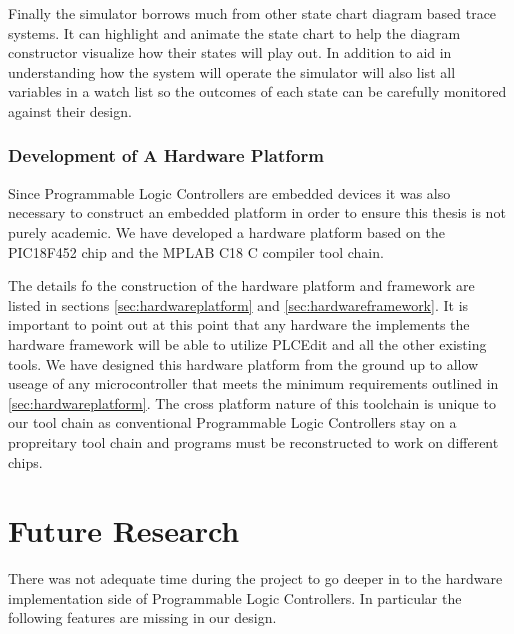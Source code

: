 Finally the simulator borrows much from other state chart diagram based trace systems. It can highlight and animate the state chart to help the diagram constructor visualize how their states will play out. In addition to aid in understanding how the system will operate the simulator will also list all variables in a watch list so the outcomes of each state can be carefully monitored against their design.

\subsubsection{Development of A Hardware Platform}
Since Programmable Logic Controllers are embedded devices it was also necessary to construct an embedded platform in order to ensure this thesis is not purely academic. We have developed a hardware platform based on the PIC18F452 chip and the MPLAB C18 C compiler tool chain.

The details fo the construction of the hardware platform and framework are listed in sections \ref{sec:hardwareplatform} and \ref{sec:hardwareframework}. It is important to point out at this point that any hardware the implements the hardware framework will be able to utilize PLCEdit and all the other existing tools. We have designed this hardware platform from the ground up to allow useage of any microcontroller that meets the minimum requirements outlined in \ref{sec:hardwareplatform}. The cross platform nature of this toolchain is unique to our tool chain as conventional Programmable Logic Controllers stay on a propreitary tool chain and programs must be reconstructed to work on different chips.


\section{Future Research}
There was not adequate time during the project to go deeper in to the hardware implementation side of Programmable Logic Controllers. In particular the following features are missing in our design.

